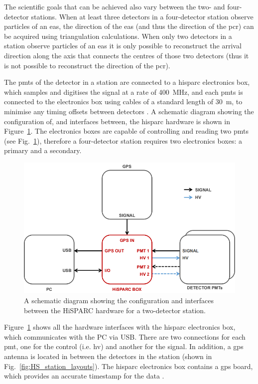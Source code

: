 The scientific goals that can be achieved also vary between the two- and four-detector stations. When at least three detectors in a four-detector station observe particles of an \gls{eas}, the direction of the \gls{eas} (and thus the direction of the \gls{pcr}) can be acquired using triangulation calculations. When only two detectors in a station observe particles of an \gls{eas} it is only possible to reconstruct the arrival direction along the axis that connects the centres of those two detectors (thus it is not possible to reconstruct the direction of the \gls{pcr}).

The \glspl{pmt} of the detector in a station are connected to a \gls{hisparc} electronics box, which samples and digitises the signal at a rate of 400~MHz, and each \glspl{pmt} is connected to the electronics box using cables of a standard length of 30~m, to minimise any timing offsets between detectors \citep{fokkema_hisparc_2012, van_dam_hisparc_2020}. A schematic diagram showing the configuration of, and interfaces between, the \gls{hisparc} hardware is shown in Figure~\ref{fig:HS_hardware_config}. The electronics boxes are capable of controlling and reading two \glspl{pmt} (see Fig.~\ref{fig:HS_hardware_config}), therefore a four-detector station requires two electronics boxes: a primary and a secondary.


\begin{figure}[ht!]
	\centering
	\includegraphics[width=\columnwidth]{HS_hardware_config.png}
	\caption{A schematic diagram showing the configuration and interfaces between the HiSPARC hardware for a two-detector station.}
	\label{fig:HS_hardware_config}
\end{figure}

Figure~\ref{fig:HS_hardware_config} shows all the hardware interfaces with the \gls{hisparc} electronics box, which communicates with the PC via USB. There are two connections for each \gls{pmt}, one for the control (i.e. \gls{hv}) and another for the signal. In addition, a \gls{gps} antenna is located in between the detectors in the station (shown in Fig.~\ref{fig:HS_station_layouts}). The \gls{hisparc} electronics box contains a \gls{gps} board, which provides an accurate timestamp for the data \citep{fokkema_hisparc_2012}.



